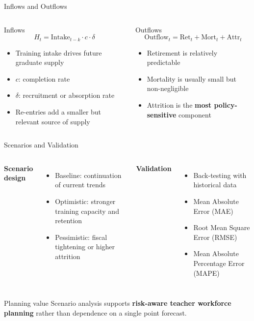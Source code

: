 \documentclass[
  11pt,
  ignorenonframetext,
  aspectratio=169,
  11pt]{beamer}
\newcommand{\highlight}[1]{\textcolor{DavidsonBlueDark}{\textbf{#1}}}
\newcommand{\gold}[1]{\textcolor{AccentGold}{\textbf{#1}}}
\begin{document}
\begin{frame}{Inflows and Outflows}
\begin{columns}[T,onlytextwidth]
\begin{block}{Inflows}
\[
H_t = \mathrm{Intake}_{t-k}\cdot c \cdot \delta
\]
\begin{itemize}
  \item Training intake drives future graduate supply
  \item $c$: completion rate
  \item $\delta$: recruitment or absorption rate
  \item Re-entries add a smaller but relevant source of supply
\end{itemize}
\end{block}
\begin{block}{Outflows}
\[
\mathrm{Outflow}_t = \mathrm{Ret}_t + \mathrm{Mort}_t + \mathrm{Attr}_t
\]
\begin{itemize}
  \item Retirement is relatively predictable
  \item Mortality is usually small but non-negligible
  \item Attrition is the \gold{most policy-sensitive} component
\end{itemize}
\end{block}
\end{columns}
\end{frame}

\begin{frame}{Scenarios and Validation}
\begin{columns}[T,onlytextwidth]
\textbf{Scenario design}
\begin{itemize}
  \item Baseline: continuation of current trends
  \item Optimistic: stronger training capacity and retention
  \item Pessimistic: fiscal tightening or higher attrition
\end{itemize}
\textbf{Validation}
\begin{itemize}
  \item Back-testing with historical data
  \item Mean Absolute Error (MAE)
  \item Root Mean Square Error (RMSE)
  \item Mean Absolute Percentage Error (MAPE)
\end{itemize}
\end{columns}
\vspace{0.2cm}
\begin{block}{Planning value}
Scenario analysis supports \highlight{risk-aware teacher workforce planning} rather than dependence on a single point forecast.
\end{block}
\end{frame}
\end{document}

